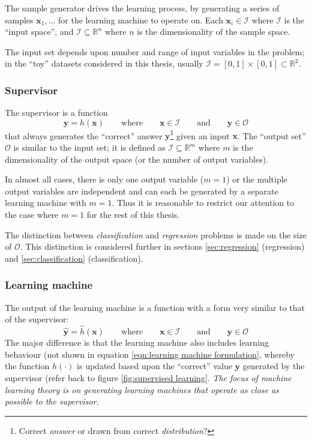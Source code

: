 The sample generator drives the learning process, by generating a
series of samples $\mathbf{x}_1, \ldots$ for the learning machine to
operate on.  Each $\mathbf{x}_i \in \mathcal{I}$ where $\mathcal{I}$
is the ``input space'', and $\mathcal{I} \subseteq \mathbb{R}^n$ where
$n$ is the dimensionality of the sample space.

The input set depends upon number and range of input variables in the
problem; in the ``toy'' datasets considered in this thesis, usually
$\mathcal{I} = [0,1] \times [0,1] \subset \mathbb{R}^2$.


\subsubsection{Supervisor}
\label{sec:supervisor}

The supervisor is a function
%
\begin{equation}
\mathbf{y} = h(\mathbf{x}) \qquad \mbox{where} \qquad \mathbf{x} \in
\mathcal{I} \qquad \mbox{and} \qquad \mathbf{y} \in \mathcal{O}
\label{eqn:supervisor}
\end{equation}
%
that always generates the ``correct'' answer
$\mathbf{y}$\footnote{Correct \emph{answer} or drawn from correct
\emph{distribution}?} given an input $\mathbf{x}$.  The ``output set''
$\mathcal{O}$ is similar to the input set; it is defined as $\mathcal{I}
\subseteq \mathbb{R}^m$ where $m$ is the dimensionality of the output
space (or the number of output variables).

In almost all cases, there is only one output variable ($m=1$) or the
multiple output variables are independent and can each
be generated by a separate learning machine with $m=1$.
Thus it is reasonable to restrict our attention to the case where
$m=1$ for the rest of this thesis.

The distinction between \emph{classification} and \emph{regression}
problems is made on the size of $\mathcal{O}$.  This distinction is 
considered further in sections \ref{sec:regression} (regression) and
\ref{sec:classification} (classification).


\subsubsection{Learning machine}
\label{sec:learning machine}

The output of the learning machine is a function with a form very
similar to that of the supervisor:
%
\begin{equation}
\mathbf{\hat{y}} = \hat{h}(\mathbf{x}) \qquad \mbox{where} \qquad
\mathbf{x} \in \mathcal{I} \qquad \mbox{and} \qquad \mathbf{y} \in
\mathcal{O}
\label{eqn:learning machine formulation}
\end{equation}
%
The major difference is that the learning machine also includes
learning behaviour (not shown in equation \ref{eqn:learning machine
formulation}, whereby the function $\hat{h}(\cdot)$ is updated
based upon the ``correct'' value $\mathbf{y}$ generated by the
supervisor (refer back to figure \ref{fig:supervised learning}.
\emph{The focus of machine learning theory is on generating learning
machines that operate as close as possible to the supervisor.}



